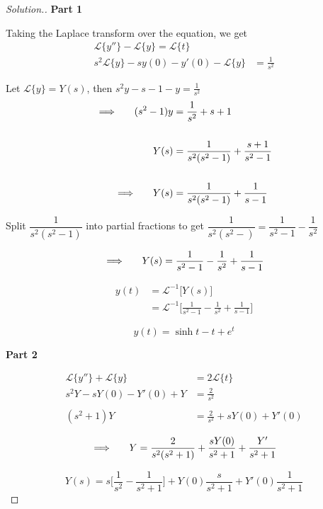 \documentclass[11pt,a4paper]{article}
\theoremstyle{definition}
\newenvironment{solution}
  {\renewcommand{\qedsymbol}{}\begin{proof}[\textit{Solution}.]}
  {\end{proof}}
\newcommand{\subhead}[1]{%
  \par\medskip\noindent\textbf{#1}\par\nobreak\smallskip}
\begin{document}
\begin{solution}
\subhead{Part 1}
Taking the Laplace transform over the equation, we get 
\begin{align*}
\mathcal{L}\{y''\} - \mathcal{L}\{y\}  = \mathcal{L}\{t\}\\
s^2 \mathcal{L}\{y\} -s y(0) - y'(0)  - \mathcal{L}\{y\} & = \frac{1}{s^2}
\end{align*}

Let $\displaystyle{\mathcal{L}\{y\} = Y(s)}$, then $\displaystyle{s^2y - s - 1 -y = \frac{1}{s^2}}$
\begin{align*}
\implies \hspace{0.5cm}(s^2 - 1)y & = \frac{1}{s^2}+ s + 1\\\\
Y(s) & = \frac{1}{s^2(s^2-1)} + \frac{s + 1}{s^2 - 1}\\\\
\implies\hspace{0.5cm} Y(s) & = \frac{1}{s^2(s^2-1)} + \frac{1}{s-1}
\end{align*}

Split $\dfrac{1}{s^2(s^2 - 1)}$ into partial fractions to get $\dfrac{1}{s^2(s^2 -)} = \dfrac{1}{s^2 -1} - \dfrac{1}{s^2}$

$$\implies \hspace{0.5cm} Y(s)  = \frac{1}{s^2 - 1} - \frac{1}{s^2} + \frac{1}{s - 1}$$

\begin{align*}
y(t) & = \mathcal{L}^{-1}\big[Y(s)\big]\\
& = \mathcal{L}^{-1}\Bigg[\frac{1}{s^2 - 1}-\frac{1}{s^2} + \frac{1}{s -1}\Bigg]
\end{align*}

$$y(t) = \sinh t - t + e^t$$

\subhead{Part 2}
\begin{align*}
\mathcal{L}\{y''\} + \mathcal{L}\{y\} & = 2\mathcal{L}\{t\}\\
s^2Y -sY(0) - Y'(0) + Y & = \frac{2}{s^2}\\\\
(s^2 +1)Y & = \frac{2}{s^2} + sY(0) + Y'(0)
\end{align*}

$$\implies \hspace{0.5cm}  Y = \frac{2}{s^2 (s^2 + 1)} + \frac{s Y(0)}{s^2 + 1} + \frac{Y'}{s^2 + 1}$$

$$Y(s) = s\big[\frac{1}{s^2}-\frac{1}{s^2 + 1}\big] + Y(0)\frac{s}{s^2 + 1} + Y'(0)\frac{1}{s^2 + 1}$$


\end{solution}
\end{document}

